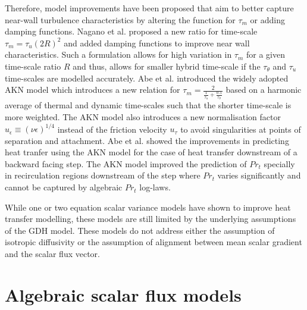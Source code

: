 Therefore, model improvements have been proposed that aim to better capture near-wall turbulence characteristics by altering the function for $\tau_{m}$ or adding damping functions. Nagano et al. \cite{Nagano1991} proposed a new ratio for time-scale $\tau_{m} = \tau_{u}(2R)^{2}$ and added damping functions to improve near wall characteristics. Such a formulation allows for high variation in $\tau_{m}$ for a given time-scale ratio $R$ and thus, allows for smaller hybrid time-scale if the $\tau_{\theta}$ and $\tau_{u}$ time-scales are modelled accurately. Abe et al. \cite{Abe1995} introduced the widely adopted AKN model which introduces a new relation for $\tau_{m} = \frac{2}{\frac{1}{\tau_{u}} + \frac{0.5}{\tau_{\theta}}}$ based on a harmonic average of thermal and dynamic time-scales such that the shorter time-scale is more weighted. The AKN model also introduces a new normalisation factor $u_{\epsilon} \equiv \left(\nu \epsilon\right)^{1/4}$ instead of the friction velocity $u_{\tau}$ to avoid singularities at points of separation and attachment. Abe et al. \cite{Abe1995} showed the improvements in predicting heat tranfer using the AKN model for the case of heat transfer downstream of a backward facing step. The AKN model improved the prediction of $Pr_{t}$ specially in recirculation regions downstream of the step where $Pr_{t}$ varies significantly and cannot be captured by algebraic $Pr_{t}$ log-laws.

While one or two equation scalar variance models have shown to improve heat transfer modelling, these models are still limited by the underlying assumptions of the GDH model. These models do not address either the assumption of isotropic diffusivity or the assumption of alignment between mean scalar gradient and the scalar flux vector.  

\section{Algebraic scalar flux models}

